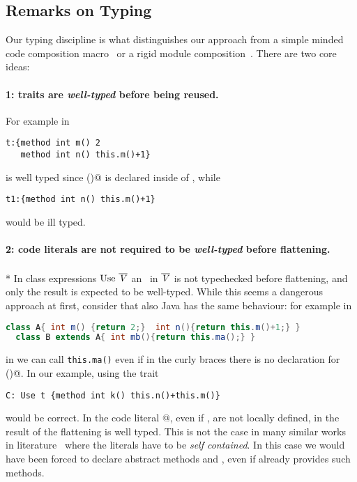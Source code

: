 \subsection{Remarks on Typing}
 Our typing discipline is 
what distinguishes our approach from a simple minded code composition macro~\cite{bawden1999quasiquotation}
or a rigid module composition~\cite{ancona2002calculus}.
There are two core ideas:

\paragraph{1: traits are \emph{well-typed} before being reused.}
 For example in

\saveSpace\begin{lstlisting}
t:{method int m() 2 
   method int n() this.m()+1}
\end{lstlisting}\saveSpace

\noindent \Q@t@ is well typed since \Q@m()@ is declared inside of \Q@t@, while

\saveSpace\begin{lstlisting}
t1:{method int n() this.m()+1} 
\end{lstlisting}\saveSpace
\noindent would be ill typed.

\paragraph{2: code literals are not required to be \emph{well-typed} before flattening.}${}_{}$\\*
In class expressions  $\use\ \overline\mV$
an \mL\ in $\overline{\mathit{V}}$ is not typechecked before flattening, and only the result is expected to be well-typed.
While this seems a dangerous approach at first, consider that also Java has the same behaviour:
for example in
\saveSpace\begin{lstlisting}[language=Java]
  class A{ int m() {return 2;}  int n(){return this.m()+1;} }
  class B extends A{ int mb(){return this.ma();} }
\end{lstlisting}\saveSpace
\noindent in \Q@B@ we can call \lstinline{this.ma()} even if in the curly braces there is no declaration for \Q@ma()@.
In our example, using the trait \Q@t@

\saveSpace\begin{lstlisting}
C: Use t {method int k() this.n()+this.m()}
\end{lstlisting}\saveSpace
\noindent would be correct. In the code literal
@, 
 even if \Q@n@, \Q@m@ are not locally defined, in 
\name the result of the flattening is well typed.
This is not the case in many similar works in literature~\cite{deep,Bettini2015282,Bergel2007} where the
literals have to be \emph{self contained}. In this case we would have been forced to
declare abstract methods \Q@n@ and \Q@m@, even if \Q@t@ already 
provides such methods.

